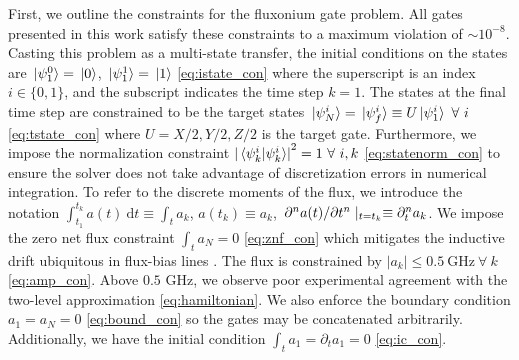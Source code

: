 First, we outline the constraints for the fluxonium gate problem.
All gates presented in this work satisfy these constraints to
a maximum violation of $\sim 10^{-8}$.
Casting this problem as a multi-state transfer, the initial conditions on
the states are $\ket*{\psi^{0}_{1}} = \ket*{0}$, $\ket*{\psi^{1}_{1}} = \ket*{1}$
\eqref{eq:istate_con}
where the superscript is an index $i \in \{0, 1\}$,
and the subscript indicates the time step $k = 1$.
The states at the final time step are constrained to be
the target states $\ket*{\psi^{i}_{N}} = \ket*{\psi^{i}_{f}} \equiv
U \ket*{\psi^{i}_{1}} \ \forall \ i$
\eqref{eq:tstate_con} where $U = X/2, Y/2, Z/2$ is the target gate.
Furthermore, we impose the normalization constraint
${\lvert \braket*{\psi^{i}_{k}}{\psi^{i}_{k}} \rvert}^{2} = 1 \ \forall \ i,k$
\eqref{eq:statenorm_con}
to ensure the solver does not take advantage of discretization errors in numerical integration.
To refer to the discrete moments of the flux, we introduce the notation
$\int^{t_{k}}_{t_{1}} a(t) \ \mathrm{d}t \equiv \int_{t} a_{k}$,
$a(t_{k}) \equiv a_{k}$,
$\pdv*[n]{a(t)}{t} \lvert_{t = t_{k}} \equiv \partial^{n}_{t} a_{k}$.
We impose the zero net flux constraint $\int_{t} a_{N} = 0$
\eqref{eq:znf_con}
which mitigates the inductive drift ubiquitous in flux-bias lines
\cite{battistel2019fast, krantz2019quantum, zhang2020universal}.
The flux is constrained by $\lvert a_{k} \rvert \leq 0.5 \ \textrm{GHz} \ \forall \ k$
\eqref{eq:amp_con}.
Above $0.5$ GHz, we observe poor experimental agreement with the two-level approximation \eqref{eq:hamiltonian}.
We also enforce the boundary condition $a_{1} = a_{N} = 0$ \eqref{eq:bound_con}
so the gates may be concatenated arbitrarily. Additionally,
we have the initial condition $\int_{t} a_{1} = \partial_{t} a_{1} = 0$
\eqref{eq:ic_con}.

